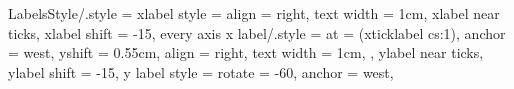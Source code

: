 
\pgfplotsset
{
	LabelsStyle/.style =
	{
		xlabel style				= {align = right, text width = 1cm},
		xlabel near ticks,
		xlabel shift				= -15,
		every axis x label/.style	=
		{
			at						= {(xticklabel cs:1)},
			anchor					= west,
			yshift					= 0.55cm,
			align					= right,
			text width				= 1cm,
		},
		ylabel near ticks,
		ylabel shift			= -15,
		y label style			= {rotate = -60, anchor = west},
	}
}

